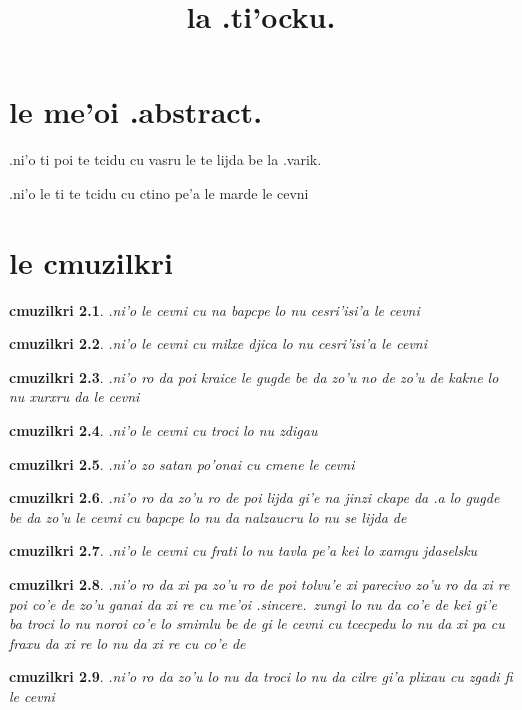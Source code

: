 \documentclass{report}
\title{la .ti'ocku.}
\newtheorem{cmuzilkri}{cmuzilkri}
\begin{document}
\maketitle
\chapter{le me'oi .abstract.}
.ni'o ti poi te tcidu cu vasru le te lijda be la .varik.

.ni'o le ti te tcidu cu ctino pe'a le marde le cevni

\chapter{le cmuzilkri}
\begin{cmuzilkri}
	.ni'o le cevni cu na bapcpe lo nu cesri'isi'a le cevni
\end{cmuzilkri}
\begin{cmuzilkri}
	.ni'o le cevni cu milxe djica lo nu cesri'isi'a le cevni
\end{cmuzilkri}
\begin{cmuzilkri}
        .ni'o ro da poi kraice le gugde be da zo'u no de zo'u de kakne lo nu xurxru da le cevni
\end{cmuzilkri}
\begin{cmuzilkri}
        .ni'o le cevni cu troci lo nu zdigau
\end{cmuzilkri}
\begin{cmuzilkri}
        .ni'o zo satan po'onai cu cmene le cevni
\end{cmuzilkri}
\begin{cmuzilkri}
        .ni'o ro da zo'u ro de poi lijda gi'e na jinzi ckape da .a lo gugde be da zo'u le cevni cu bapcpe lo nu da nalzaucru lo nu se lijda de
\end{cmuzilkri}
\begin{cmuzilkri}
        .ni'o le cevni cu frati lo nu tavla pe'a kei lo xamgu jdaselsku
\end{cmuzilkri}
\begin{cmuzilkri}
        .ni'o ro da xi pa zo'u ro de poi tolvu'e xi parecivo zo'u ro da xi re poi co'e de zo'u ganai da xi re cu me'oi .sincere.\ zungi lo nu da co'e de kei gi'e ba troci lo nu noroi co'e lo smimlu be de gi le cevni cu tcecpedu lo nu da xi pa cu fraxu da xi re lo nu da xi re cu co'e de
\end{cmuzilkri}
\begin{cmuzilkri}
        .ni'o ro da zo'u lo nu da troci lo nu da cilre gi'a plixau cu zgadi fi le cevni
\end{cmuzilkri}
\end{document}

